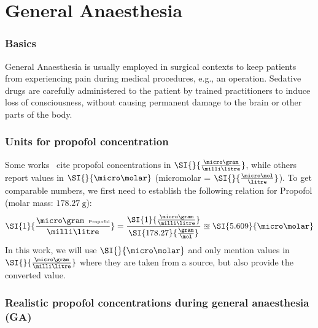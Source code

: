 \section{General Anaesthesia}\label{sec:general-anaesthesia}
\subsubsection{Basics}
General Anaesthesia is usually employed in surgical contexts to keep patients from experiencing pain during medical
procedures, e.g., an operation.
Sedative drugs are carefully administered to the patient by trained practitioners to induce loss of consciousness,
without causing permanent damage to the brain or other parts of the body.



\subsubsection{Units for propofol concentration}
Some works~\cite{iwakiri_individual_2005} cite propofol concentrations in $\SI{}{\frac{\micro\gram}{\milli\litre}}$,
while others~\cite{kitamura_effects_2003, mcdougall_propofol_2008} report values in $\SI{}{\micro\molar}$ (micromolar =
$\SI{}{\frac{\micro\mol}{\litre}}$).
To get comparable numbers, we first need to establish the following relation for Propofol
(molar mass: $\SI{178.27}{\gram}$):
\[ \SI{1}{\frac{\micro\gram\hspace{0.5em}\text{\tiny{Propofol}}}{\milli\litre}}  =
\frac{ \SI{1}{\frac{\micro\gram}{\milli\litre}}}{\SI{178.27}{\frac{\gram}{\mol}}} \approxeq \SI{5.609}{\micro\molar} \]
In this work, we will use $\SI{}{\micro\molar}$
and only mention values in $\SI{}{\frac{\micro\gram}{\milli\litre}}$ where they are taken from a source,
but also provide the converted value.


\subsubsection{Realistic propofol concentrations during general anaesthesia (GA)}\label{subsec:realistic-prop-conc-during-ga}

